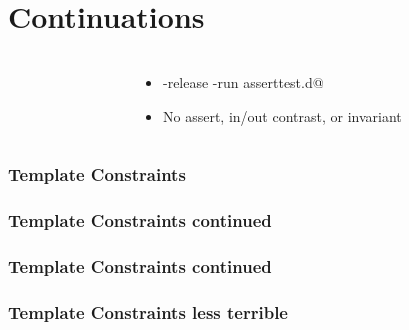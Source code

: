 \documentclass[aspectratio=169,notes]{beamer}
\begin{document}
	\section{Continuations}

	\begin{frame}[t]
		\frametitle{\lstinline@assert@s}
		\begin{columns}[T]
		\begin{column}{0.49\textwidth}
		
		\end{column}
		\begin{column}{0.49\textwidth}
		
		\begin{itemize}
			\item \lstinline@dmd -release -run asserttest.d@
			\pause
			\item No assert, in/out contrast, or invariant
		\end{itemize}
		\end{column}
		\end{columns}
	\end{frame}

	\begin{frame}[t]
		\frametitle{Template Constraints}
		
	\end{frame}

	\begin{frame}[t]
		\frametitle{Template Constraints continued}
		
	\end{frame}

	\begin{frame}[t]
		\frametitle{Template Constraints continued}
		
	\end{frame}

	\begin{frame}[t]
		\frametitle{Template Constraints less terrible}
		
	\end{frame}
\end{document}
